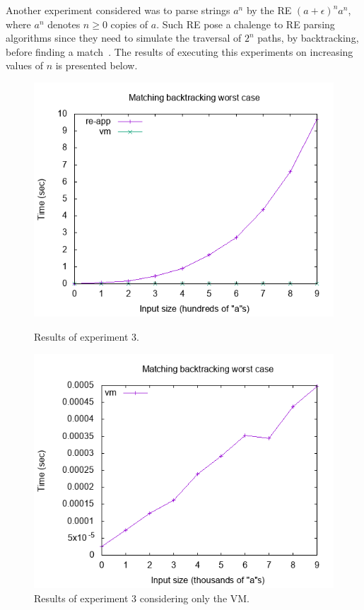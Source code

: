 \documentclass[review]{elsarticle}
\theoremstyle{definition}
\begin{document}
Another experiment considered was to parse strings $a^n$ by the RE $(a +
\epsilon)^na^n$, where $a^n$ denotes $n \geq 0$ copies of $a$. Such RE pose a 
chalenge to RE parsing algorithms since they need to simulate the traversal of
$2^n$ paths, by backtracking, before finding a match~\cite{Lasse2011}. The
results of executing this experiments on increasing values of $n$ is presented 
below.


\begin{figure}[h]
  \centering
  \begin{minipage}{0.45\textwidth}
    \includegraphics[width=.9\textwidth]{backtrack.png}
    \caption{Results of experiment 3.}
    \label{fig:graph3}
  \end{minipage} \hfill
  \begin{minipage}{0.45\textwidth}
    \includegraphics[width=.9\textwidth]{backtrack1.png}
    \caption{Results of experiment 3 considering only the VM.}
    \label{fig:graph4}
  \end{minipage}
\end{figure}
\end{document}

